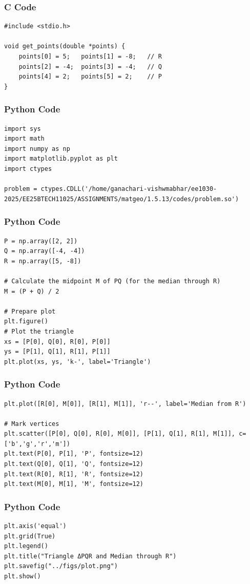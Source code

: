 \documentclass{beamer}
\begin{document}
\begin{frame}[fragile]
    \frametitle{C Code}
    \begin{lstlisting}
#include <stdio.h>

void get_points(double *points) {
    points[0] = 5;   points[1] = -8;   // R
    points[2] = -4;  points[3] = -4;   // Q
    points[4] = 2;   points[5] = 2;    // P
}
    \end{lstlisting}
\end{frame}

\begin{frame}[fragile]
    \frametitle{Python Code}
    \begin{lstlisting}
import sys
import math
import numpy as np
import matplotlib.pyplot as plt
import ctypes

problem = ctypes.CDLL('/home/ganachari-vishwmabhar/ee1030-2025/EE25BTECH11025/ASSIGNMENTS/matgeo/1.5.13/codes/problem.so')
    \end{lstlisting}
\end{frame}

\begin{frame}[fragile]
    \frametitle{Python Code}
    \begin{lstlisting}
P = np.array([2, 2])
Q = np.array([-4, -4])
R = np.array([5, -8])

# Calculate the midpoint M of PQ (for the median through R)
M = (P + Q) / 2

# Prepare plot
plt.figure()
# Plot the triangle
xs = [P[0], Q[0], R[0], P[0]]
ys = [P[1], Q[1], R[1], P[1]]
plt.plot(xs, ys, 'k-', label='Triangle')
    \end{lstlisting}
\end{frame}

\begin{frame}[fragile]
    \frametitle{Python Code}
    \begin{lstlisting}
plt.plot([R[0], M[0]], [R[1], M[1]], 'r--', label='Median from R')

# Mark vertices
plt.scatter([P[0], Q[0], R[0], M[0]], [P[1], Q[1], R[1], M[1]], c=['b','g','r','m'])
plt.text(P[0], P[1], 'P', fontsize=12)
plt.text(Q[0], Q[1], 'Q', fontsize=12)
plt.text(R[0], R[1], 'R', fontsize=12)
plt.text(M[0], M[1], 'M', fontsize=12)
    \end{lstlisting}
\end{frame}

\begin{frame}[fragile]
    \frametitle{Python Code}
    \begin{lstlisting}
plt.axis('equal')
plt.grid(True)
plt.legend()
plt.title("Triangle ΔPQR and Median through R")
plt.savefig("../figs/plot.png")
plt.show()
    \end{lstlisting}
\end{frame}
\end{document}
